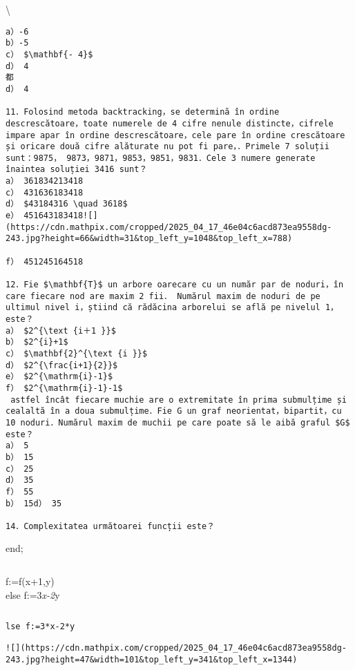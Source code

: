 \textbackslash 

\begin{verbatim}
a）-6
b）-5
c） $\mathbf{- 4}$
d） 4
都
d） 4

11．Folosind metoda backtracking，se determină în ordine descrescătoare，toate numerele de 4 cifre nenule distincte，cifrele impare apar în ordine descrescătoare，cele pare în ordine crescătoare și oricare două cifre alăturate nu pot fi pare，．Primele 7 soluții sunt：9875， 9873，9871，9853，9851，9831．Cele 3 numere generate înaintea soluției 3416 sunt？
a） 361834213418
c） 431636183418
d） $43184316 \quad 3618$
e） 451643183418![](https://cdn.mathpix.com/cropped/2025_04_17_46e04c6acd873ea9558dg-243.jpg?height=66&width=31&top_left_y=1048&top_left_x=788)

f） 451245164518

12．Fie $\mathbf{T}$ un arbore oarecare cu un număr par de noduri，în care fiecare nod are maxim 2 fii． Numărul maxim de noduri de pe ultimul nivel i，știind că rădăcina arborelui se află pe nivelul 1，este？
a） $2^{\text {i＋1 }}$
b） $2^{i}+1$
c） $\mathbf{2}^{\text {i }}$
d） $2^{\frac{i+1}{2}}$
e） $2^{\mathrm{i}-1}$
f） $2^{\mathrm{i}-1}-1$
 astfel încât fiecare muchie are o extremitate în prima submulțime și cealaltă în a doua submulțime．Fie G un graf neorientat，bipartit，cu 10 noduri．Numărul maxim de muchii pe care poate să le aibă graful $G$ este？
a） 5
b） 15
c） 25
d） 35
f） 55
b） 15d） 35

14．Complexitatea următoarei funcții este？
\end{verbatim}

end;

\begin{verbatim}

\end{verbatim}

f:=f(x+1,y)\\
else f:=3\textit{x-2}y

\begin{verbatim}

\end{verbatim}

\begin{verbatim}
lse f:=3*x-2*y
\end{verbatim}

\begin{verbatim}
![](https://cdn.mathpix.com/cropped/2025_04_17_46e04c6acd873ea9558dg-243.jpg?height=47&width=101&top_left_y=341&top_left_x=1344)
                                                    
\end{verbatim}


